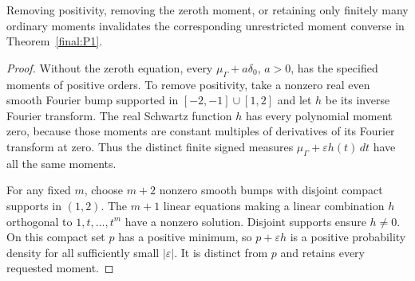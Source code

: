 \begin{proposition}
\label{final:P1-boundaries}
Removing positivity, removing the zeroth moment, or retaining only
finitely many ordinary moments invalidates the corresponding
unrestricted moment converse in Theorem~\ref{final:P1}.
\end{proposition}
\begin{proof}
Without the zeroth equation, every $\mu_\Gamma+a\delta_0$, $a>0$,
has the specified moments of positive orders.  To remove positivity,
take a nonzero real even smooth Fourier bump supported in
$[-2,-1]\cup[1,2]$ and let $h$ be its inverse Fourier transform.
The real Schwartz function $h$ has every polynomial moment zero,
because those moments are constant multiples of derivatives of its
Fourier transform at zero.  Thus the distinct finite signed measures
$\mu_\Gamma+\varepsilon h(t)\,dt$ have all the same moments.

For any fixed $m$, choose $m+2$ nonzero smooth bumps with disjoint
compact supports in $(1,2)$.  The $m+1$ linear equations making a
linear combination $h$ orthogonal to $1,t,\ldots,t^m$ have a nonzero
solution.  Disjoint supports ensure $h\neq0$.  On this compact set
$p$ has a positive minimum, so $p+\varepsilon h$ is a positive
probability density for all sufficiently small $|\varepsilon|$.
It is distinct from $p$ and retains every requested moment.
\end{proof}

